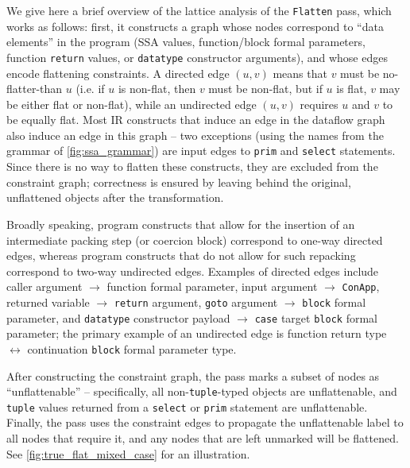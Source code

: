 We give here a brief overview of the lattice analysis of the \texttt{Flatten}
pass, which works as follows: first, it constructs a graph whose nodes
correspond to ``data elements'' in the program (SSA values, function/block
formal parameters, function \texttt{return} values, or \texttt{datatype}
constructor arguments), and whose edges encode flattening constraints. A
directed edge $(u, v)$ means that $v$ must be no-flatter-than $u$ (i.e. if $u$
is non-flat, then $v$ must be non-flat, but if $u$ is flat, $v$ may be either
flat or non-flat), while an undirected edge $(u, v)$ requires $u$ and $v$ to be
equally flat. Most IR constructs that induce an edge in the dataflow graph also
induce an edge in this graph -- two exceptions (using the names from the grammar
of \cref{fig:ssa_grammar}) are input edges to \texttt{prim} and \texttt{select}
statements. Since there is no way to flatten these constructs, they are excluded
from the constraint graph; correctness is ensured by leaving behind the
original, unflattened objects after the transformation.

Broadly speaking, program constructs that allow for the insertion of an
intermediate packing step (or coercion block) correspond to one-way directed
edges, whereas program constructs that do not allow for such repacking
correspond to two-way undirected edges. Examples of directed edges include
caller argument $\rightarrow$ function formal parameter, input argument
$\rightarrow$ \texttt{ConApp}, returned variable $\rightarrow$ \texttt{return}
argument, \texttt{goto} argument $\rightarrow$ \texttt{block} formal parameter,
and \texttt{datatype} constructor payload $\rightarrow$ \texttt{case} target
\texttt{block} formal parameter; the primary example of an undirected edge is
function return type $\leftrightarrow$ continuation \texttt{block} formal
parameter type.

After constructing the constraint graph, the pass marks a subset of nodes as
``unflattenable'' -- specifically, all non-\texttt{tuple}-typed objects are
unflattenable, and \texttt{tuple} values returned from a \texttt{select} or
\texttt{prim} statement are unflattenable. Finally, the pass uses the constraint
edges to propagate the unflattenable label to all nodes that require it, and any
nodes that are left unmarked will be flattened. See
\cref{fig:true_flat_mixed_case} for an illustration.



